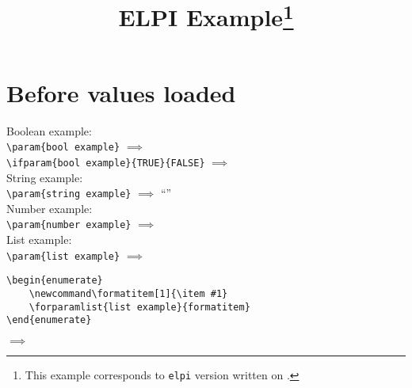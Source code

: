 \documentclass{article}
\begin{document}
    \title{ELPI Example\thanks{This example corresponds to \texttt{elpi} version \gitversion{} written on \gitdate.}}
    \author{\dogitauthors[\\]}
    \maketitle

        \section*{Before values loaded}

        Boolean example:\\

        \lstinline|\param{bool example}|
        $\implies$
        \\

        \lstinline[style=TeX,morekeywords={ifparam}]|\ifparam{bool example}{TRUE}{FALSE}|
        $\implies$
        \\

        String example:\\

        \lstinline|\param{string example}|
        $\implies$
        ``''\\

        Number example:\\

        \lstinline|\param{number example}|
        $\implies$
        \\

        List example:\\

        \lstinline|\param{list example}|
        $\implies$
        \\

        \begin{lstlisting}[language={[LaTeX]TeX},morekeywords={formatitem,forparamlist}]
\begin{enumerate}
    \newcommand\formatitem[1]{\item #1}
    \forparamlist{list example}{formatitem}
\end{enumerate}
        \end{lstlisting}
        $\implies$
        \begin{enumerate}
            \newcommand\formatitem[1]{\item #1}
        \end{enumerate}
\end{document}

